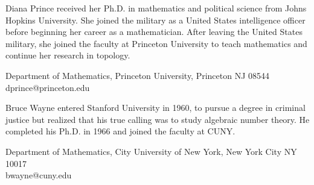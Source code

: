 \documentclass{article}
\theoremstyle{theorem}
\theoremstyle{definition}
\begin{document}
\begin{biog}
\item[Diana Prince] received her Ph.D. in mathematics and political science from Johns Hopkins University. She joined the military as a United States intelligence officer before beginning her career as a mathematician.  After leaving the United States military, she joined the faculty at Princeton University to teach mathematics and continue her research in topology.
\begin{affil}
Department of Mathematics, Princeton University, Princeton NJ 08544\\
dprince@princeton.edu
\end{affil}

\item[Bruce Wayne] entered Stanford University in 1960, to pursue a degree in criminal justice but realized that his true calling was to study algebraic number theory.  He completed his Ph.D. in 1966 and joined the faculty at CUNY.
\begin{affil}
Department of Mathematics, City University of New York, New York City NY 10017\\
bwayne@cuny.edu
\end{affil}
\end{biog}
\vfill\eject
\end{document}
